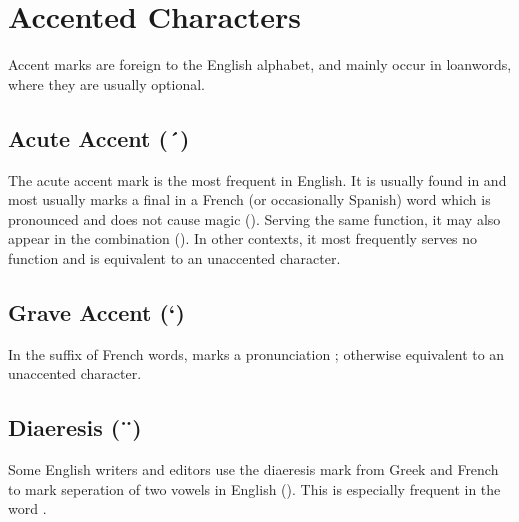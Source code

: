 \section{Accented Characters}

Accent marks are foreign to the English alphabet, and mainly occur in loanwords,
where they are usually optional.

\subsection{Acute Accent (´)}

The acute accent mark is the most frequent in English. It is usually found in
 and most usually marks a final  in a French (or occasionally
Spanish) word which is pronounced  and does not cause magic 
(). Serving the same function, it may also
appear in the combination  (). In other contexts, it most
frequently serves no function and is equivalent to an unaccented character.

\subsection{Grave Accent (`)}

In the suffix  of French words, marks a pronunciation ;
otherwise equivalent to an unaccented character.

\subsection{Diaeresis (¨)}

Some English writers and editors use the diaeresis mark from Greek and French to
mark seperation of two vowels in English (). This is
especially frequent in the word .

